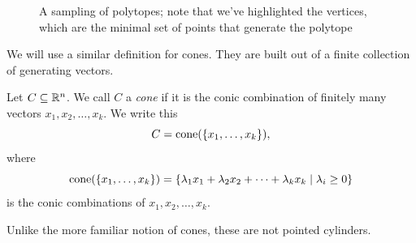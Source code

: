 \documentclass[12pt,oneside]{../../sfsuthesis}
\begin{document}
\begin{figure}[H]
\begin{subfigure}[t]{0.4\textwidth}
    \end{subfigure}
    \caption{A sampling of polytopes; note that we've highlighted the vertices, which are the minimal set of points that generate the polytope }
\end{figure}

We will use a similar definition for cones.
They are built out of a finite collection of generating vectors.
\begin{definition}[Cone]\th\label{def:cone}
    Let \( C \subseteq \mathbb{R}^n \).
    We call \( C \) a \emph{cone} if it is the conic combination of finitely many vectors \( x_1, x_2, \dots, x_k \).
    We write this
    \[
        C = \mathrm{cone}(\{x_1, \dots, x_k\}),
    \]
    where
    \[
        \mathrm{cone}(\{x_1, \dots, x_k\}) = \left\{ \lambda_1 x_1 + \lambda_2 x_2 + \cdots + \lambda_k x_k \; \middle| \; \lambda_i \geq 0 \right\}
    \]
    is the conic combinations of \( x_1, x_2, \dots, x_k \).

\end{definition}
Unlike the more familiar notion of cones, these are not pointed cylinders.
\end{document}
